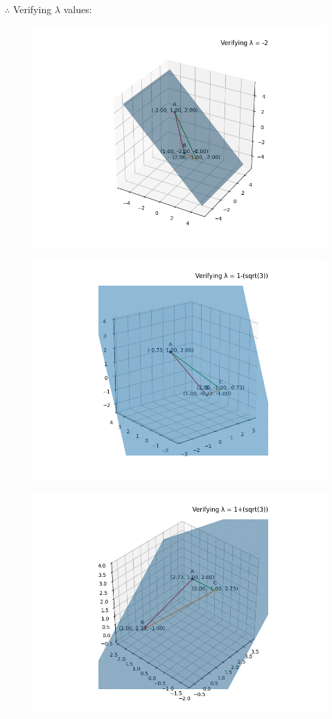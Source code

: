 \documentclass[journal]{IEEEtran}
\begin{document}
$\therefore$ Verifying $\lambda$ values:
    \begin{figure}[h]
        \centering
       \includegraphics[width=0.7\linewidth]{figs/fig1.png}
       \caption{}
       \label{graph}
    \end{figure}
    \begin{figure}[h]
        \centering
       \includegraphics[width=0.7\linewidth]{figs/fig2.png}
       \caption{}
       \label{graph}
    \end{figure}
    \begin{figure}[h]
        \centering
       \includegraphics[width=0.7\linewidth]{figs/fig3.png}
       \caption{}
       \label{graph}
    \end{figure}
\end{document}
